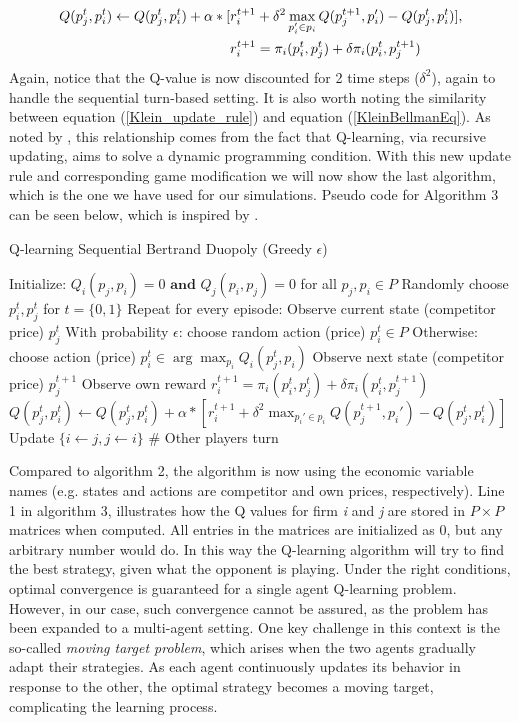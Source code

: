 \documentclass{article}
\begin{document}
\begin{align}
\label{Klein_update_rule}
Q(p_j^t,p_i^t)\leftarrow Q(p_j^t,p_i^t)+\alpha *[&r_i^{t+1}+\delta^2 \max_{p_i'\in p_i} Q(p_j^{t+1},p_i') -Q(p_j^t,p_i^t)], \\
&r_i^{t+1} = \pi_i(p^t_i,p^t_j)+\delta\pi_i(p_i^t,p_j^{t+1}) \notag 
\end{align}
Again, notice that the Q-value is now discounted for 2 time steps ($\delta^2$), again to handle the sequential turn-based setting.
\newline 
It is also worth noting the similarity between equation (\ref{Klein_update_rule}) and equation (\ref{KleinBellmanEq}). As noted by \cite{Klein2021}, this relationship comes from the fact that Q-learning, via recursive updating, aims to solve a dynamic programming condition.
\newline 
With this new update rule and corresponding game modification we will now show the last algorithm, which is the one we have used for our simulations. Pseudo code for Algorithm 3 can be seen below, which is inspired by \cite{Julius2023}.  
\begin{algorithm}[H]
\caption{Q-learning Sequential Bertrand Duopoly (Greedy $\epsilon$)}
\begin{algorithmic}[1]
\State Initialize: \( Q_i(p_j, p_i) = 0 \textbf{ and } Q_j(p_i, p_j) = 0 \) for all \( p_j, p_i \in P \)
\State Randomly choose \(p_i^t,p_j^t\) for \(t = \{0,1\}\) 
\State Repeat for every episode:
    \State Observe current state (competitor price) \( p_j^t \)
    \State With probability \( \epsilon \): choose random action (price) \( p_i^t \in P \)
    \State Otherwise: choose action (price)  \( p_i^t \in \arg \max_{p_i} Q_i(p_j^t, p_i) \)
    \State Observe next state (competitor price) \( p_j^{t+1} \)
    \State Observe own reward \(r_i^{t+1} = \pi_i(p^t_i,p^t_j)+\delta\pi_i(p_i^t,p_j^{t+1}) \) 
    \State \( Q(p_j^t,p_i^t)\gets Q(p_j^t,p_i^t)+\alpha *[r_i^{t+1}+\delta^2 \max_{p_i'\in p_i} Q(p_j^{t+1},p_i') -Q(p_j^t,p_i^t)]\)
    \State Update $\{i\leftarrow j,j\leftarrow i\}$ \# Other players turn
\EndFor
\end{algorithmic}
\end{algorithm}
Compared to algorithm 2, the algorithm is now using the economic variable names (e.g. states and actions are competitor and own prices, respectively).
Line 1 in algorithm 3, illustrates how the Q values for firm \textit{i} and \textit{j}  are stored in $P\times P$ matrices when computed. All entries in the matrices are initialized as 0, but any arbitrary number would do.
In this way the Q-learning algorithm will try to find the best strategy, given what the opponent is playing.
\newline
Under the right conditions, optimal convergence is guaranteed for a single agent Q-learning problem. However, in our case, such convergence cannot be assured, as the problem has been expanded to a multi-agent setting. One key challenge in this context is the so-called \textit{moving target problem}, which arises when the two agents gradually adapt their strategies. As each agent continuously updates its behavior in response to the other, the optimal strategy becomes a moving target, complicating the learning process.
\end{document}
